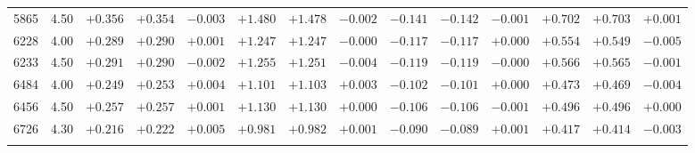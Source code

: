 \documentclass[]{aa}
\begin{document}
\begin{appendix}
\begin{table*}
\begin{center}
\begin{tabular}{llllllllllllll}
5865  &4.50 &$ +0.356$ &$ +0.354$ &$ -0.003$ &$ +1.480$ &$ +1.478$ &$ -0.002$ &$ -0.141$ &$ -0.142$ &$ -0.001$ &$ +0.702$ &$ +0.703$ &$ +0.001$\\
6228  &4.00 &$ +0.289$ &$ +0.290$ &$ +0.001$ &$ +1.247$ &$ +1.247$ &$ -0.000$ &$ -0.117$ &$ -0.117$ &$ +0.000$ &$ +0.554$ &$ +0.549$ &$ -0.005$\\
6233  &4.50 &$ +0.291$ &$ +0.290$ &$ -0.002$ &$ +1.255$ &$ +1.251$ &$ -0.004$ &$ -0.119$ &$ -0.119$ &$ -0.000$ &$ +0.566$ &$ +0.565$ &$ -0.001$\\
6484  &4.00 &$ +0.249$ &$ +0.253$ &$ +0.004$ &$ +1.101$ &$ +1.103$ &$ +0.003$ &$ -0.102$ &$ -0.101$ &$ +0.000$ &$ +0.473$ &$ +0.469$ &$ -0.004$\\
6456  &4.50 &$ +0.257$ &$ +0.257$ &$ +0.001$ &$ +1.130$ &$ +1.130$ &$ +0.000$ &$ -0.106$ &$ -0.106$ &$ -0.001$ &$ +0.496$ &$ +0.496$ &$ +0.000$\\
6726  &4.30 &$ +0.216$ &$ +0.222$ &$ +0.005$ &$ +0.981$ &$ +0.982$ &$ +0.001$ &$ -0.090$ &$ -0.089$ &$ +0.001$ &$ +0.417$ &$ +0.414$ &$ -0.003$\\
\hline\noalign{\smallskip}
\hline\noalign{\smallskip}
\end{tabular}
\end{center}
\end{table*}




\end{appendix}
\end{document}
